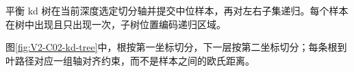 \documentclass[UTF8,a4paper,11pt,openany]{ctexbook}
\begin{document}
\setcounter{page}{249}
\setcounter{chapter}{13}
\setcounter{figure}{1}
\pagestyle{headings}
\begin{optimizationbox}
平衡 kd 树在当前深度选定切分轴并提交中位样本，再对左右子集递归。每个样本在树中出现且只出现一次，子树位置编码递归区域。
\end{optimizationbox}

图\ref{fig:V2-C02-kd-tree}中，根按第一坐标切分，下一层按第二坐标切分；每条根到叶路径对应一组轴对齐约束，而不是样本之间的欧氏距离。
\end{document}
